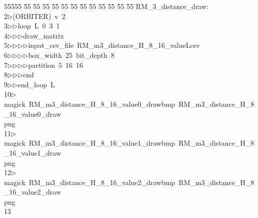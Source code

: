 %
%
\begin{tabbing}
55555 \= 55 \= 55 \= 55 \= 55 \= 55 \= 55 \= 55 \= 55 \= 55 \= 55 \= 55 \= 55 \= \>RM\_3\_distance\_draw:\\[0pt]
2\>$\triangleright$\>(ORBITER)\ v\ 2\ \\[0pt]
3\>$\triangleright$\>$\triangleright$\>loop\ L\ 0\ 3\ 1\ \\[0pt]
4\>$\triangleright$\>$\triangleright$\>$\triangleright$\>draw\_matrix\ \\[0pt]
5\>$\triangleright$\>$\triangleright$\>$\triangleright$\>$\triangleright$\>input\_csv\_file\ RM\_m3\_distance\_H\_8\_16\_valueLcsv\ \\[0pt]
6\>$\triangleright$\>$\triangleright$\>$\triangleright$\>$\triangleright$\>box\_width\ 25\ bit\_depth\ 8\ \\[0pt]
7\>$\triangleright$\>$\triangleright$\>$\triangleright$\>$\triangleright$\>partition\ 5\ 16\ 16\ \\[0pt]
8\>$\triangleright$\>$\triangleright$\>$\triangleright$\>end\ \\[0pt]
9\>$\triangleright$\>$\triangleright$\>end\_loop\ L\\[0pt]
10\>$\triangleright$\>magick\ RM\_m3\_distance\_H\_8\_16\_value0\_drawbmp\ RM\_m3\_distance\_H\_8\_16\_value0\_draw\\[0pt]
\>png\\[0pt]
11\>$\triangleright$\>magick\ RM\_m3\_distance\_H\_8\_16\_value1\_drawbmp\ RM\_m3\_distance\_H\_8\_16\_value1\_draw\\[0pt]
\>png\\[0pt]
12\>$\triangleright$\>magick\ RM\_m3\_distance\_H\_8\_16\_value2\_drawbmp\ RM\_m3\_distance\_H\_8\_16\_value2\_draw\\[0pt]
\>png\\[0pt]
13\>\end{tabbing}
